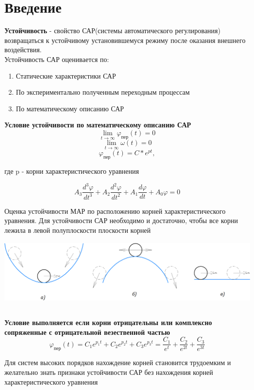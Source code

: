 \documentclass[12pt, a4paper]{report}
\begin{document}
\section*{Введение}
\textbf{Устойчивость} - свойство САР(системы автоматического регулирования) возвращаться к устойчивому установившемуся режиму после оказания внешнего воздействия. \\

Устойчивость САР оценивается по:
\begin{enumerate}
  \item Статические характеристики САР
  \item По экспериментально полученным переходным процессам
  \item По математическому описанию САР
\end{enumerate}

\textbf{Условие устойчивости по математическому описанию САР}
\[ \lim\limits_{ t\rightarrow\infty}{\varphi_{пер}(t)} = 0\]
\[ \lim\limits_{ t\rightarrow\infty}{\omega(t)} = 0\]
\[ \varphi_{пер}(t) = C * e^{pt}, \]
\centerline{где p - корни характеристического уравнения}
\begin{displaymath}
A_{3}\frac{d^{3}\varphi}{dt^{3}} + A_{2}\frac{d^{2}\varphi}{dt^{2}} + A_{1}\frac{d\varphi}{dt} + A_{0}\varphi = 0
\end{displaymath}

Оценка устойчивости МАР по расположению корней характеристического уравнения.
Для устойчивости САР необходимо и достаточно, чтобы все корни лежила в левой полуплоскости плоскости корней \\

\includegraphics[width=15cm, height=4cm]{condition}


\textbf{Условие выполняется если корни отрицательны или комплексно сопряженные с отрицательной везественной частью}
\begin{displaymath}
\varphi_{\text{пер}}(t) = C_{1}e^{p_{1}t} + C_{2}e^{p_{2}t} + C_{3}e^{p_{3}t} =
\frac{C_{1}}{e^{t}} + \frac{C_{2}}{e^{2t}} + \frac{C_{3}}{e^{3t}}
\end{displaymath}

Для систем высоких порядков нахождение корней становится трудоемким и желательно знать признаки устойчивости
САР без нахождения корней характеристического уравнения
\end{document}
